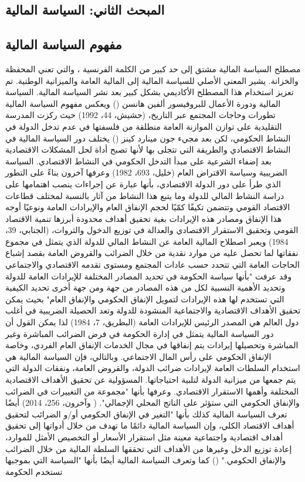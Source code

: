 \documentclass[10pt,a4paper]{report}
\begin{document}
\begin{doublespacing}
\section{المبحث الثاني: السياسة المالية}
\subsection{مفهوم السياسة المالية}
مصطلح السياسة المالية مشتق إلى حد كبير من الكلمة الفرنسية ، والتي تعني المحفظة والخزانة. يشير المعنى الأصلي للسياسة المالية إلى المالية العامة والميزانية الوطنية. تم تعزيز استخدام هذا المصطلح الأكاديمي بشكل كبير بعد نشر السياسة المالية. السياسة المالية ودورة الأعمال للبروفيسور ألفين هانسن () ويعكس مفهوم السياسة المالية تطورات وحاجات المجتمع عبر التاريخ، (حشيش، 44، 1992) حيث ركزت المدرسة التقليدية على توازن الموازنة العامة منطلقة من فلسفتها في عدم تدخل الدولة في النشاط الحكومي، لكن بعد مجيء جون مينارد كينز () يختلف دور السياسة المالية في النشاط الاقتصادي والطريقة التي تتجلى بها لأنها تصبح أداة لحل المشكلات الاقتصادية بعد إضفاء الشرعية على مبدأ التدخل الحكومي في النشاط الاقتصادي. السياسة الضريبية وسياسة الاقتراض العام (خليل، 693، 1982) وعرفها آخرون بناءً على التطور الذي طرأ على دور الدولة الاقتصادي، بأنها عبارة عن إجراءات ينصب اهتمامها على دراسة النشاط المالي للدولة وما يتبع هذا النشاط من آثار بالنسبة لمختلف قطاعات الاقتصاد القومي وتتضمن تكيفًا كمّيًا لحجم الإنفاق العام والإيرادات العامة ونوعيًا أوجه هذا الإنفاق ومصادر هذه الإيرادات بغية تحقيق أهداف محدودة أبرزها تنمية الاقتصاد القومي وتحقيق الاستقرار الاقتصادي والعدالة في توزيع الدخول والثروات، (الجنابي، 39، 1984) ويعبر اصطلاح المالية العامة عن النشاط المالي للدولة الذي يتمثل في مجموع نفقاتها لما تحصل عليه من موارد نقدية من خلال الضرائب والقروض العامة بقصد إشباع الحاجات العامة التي تتحدد حسب عادات المجتمع ومستوى تقدمه الاقتصادي والاجتماعي وقد عرفت "بأنها سياسة الحكومة في تحديد المصادر المختلفة للإيرادات العامة للدولة وتحديد الأهمية النسبية لكل من هذه المصادر من جهة ومن جهة أخرى تحديد الكيفية التي تستخدم لها هذه الإيرادات لتمويل الإنفاق الحكومي والإنفاق العام" بحيث يمكن تحقيق الأهداف الاقتصادية والاجتماعية المنشودة للدولة وتعد الحصيلة الضريبية في أغلب دول العالم هي المصدر الرئيس للإيرادات العامة (البطريق، 7، 1984) لذا يمكن القول أن دور السياسة المالية يتمثل في إدارة الحكومة في فرض الضرائب المباشرة وغير المباشرة وتحصيلها إيرادات يتم إنفاقها في مجال الخدمات الإنفاق العام الفردي، وخاصة الإنفاق الحكومي على رأس المال الاجتماعي. وبالتالي، فإن السياسة المالية هي استخدام السلطات العامة لإيرادات ضرائب الدولة، والقروض العامة، ونفقات الدولة التي يتم جمعها من ميزانية الدولة لتلبية احتياجاتها. المسؤولية عن تحقيق الأهداف الاقتصادية المختلفة وأهمها الاستقرار الاقتصادي. وعرفها بأنها "مجموعة من التغييرات في الضرائب والإنفاق الحكومي التي ستؤثر على الناتج المحلي الإجمالي". ( وآخرون، 256، 2014) أيضًا تعرف السياسة المالية كذلك بأنها "التغير في الإنفاق الحكومي أو/و الضرائب لتحقيق أهداف الاقتصاد الكلي، وإن السياسة المالية دائمًا ما تهدف من خلال أدواتها إلى تحقيق أهداف اقتصادية واجتماعية معينة مثل استقرار الأسعار أو التخصيص الأمثل للموارد، إعادة توزيع الدخل وغيرها من الأهداف التي تحققها السلطة المالية من خلال الضرائب والإنفاق الحكومي." () كما وتعرف السياسة المالية أيضًا بأنها "السياسة التي بموجبها تستخدم الحكومة 
\end{doublespacing}
\end{document}
